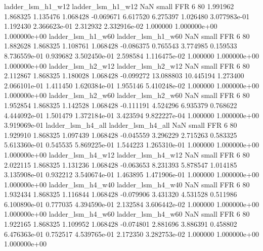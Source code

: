        ladder_lsm_h1_w12        ladder_lsm_h1_w12                   NaN      small      FFR                 6 80 1.991962       1.868325 1.135476       1.068428   -0.069671      6.617520      6.275397     1.026480   3.077983e-01  1.192430 2.366623e-01     2.312932   2.332916e-02            1.000000    1.000000e+00        1.000000e+00
       ladder_lsm_h1_w60        ladder_lsm_h1_w60                   NaN      small      FFR                 6 80 1.882628       1.868325 1.108761       1.068428   -0.086375      0.765543      3.774985     0.159533   8.736559e-01  0.939682 3.502450e-01     2.598584   1.116475e-02            1.000000    1.000000e+00        1.000000e+00
       ladder_lsm_h2_w12        ladder_lsm_h2_w12                   NaN      small      FFR                 6 80 2.112867       1.868325 1.180028       1.068428   -0.099272     13.088803     10.445194     1.273400   2.066101e-01  1.411450 1.620384e-01     1.955146   5.410248e-02            1.000000    1.000000e+00        1.000000e+00
       ladder_lsm_h2_w60        ladder_lsm_h2_w60                   NaN      small      FFR                 6 80 1.952854       1.868325 1.142528       1.068428   -0.111191      4.524296      6.935379     0.768622   4.444092e-01  1.501479 1.372184e-01     3.423594   9.822227e-04            1.000000    1.000000e+00        3.919069e-01
       ladder_lsm_h4_all        ladder_lsm_h4_all                   NaN      small      FFR                 6 80 1.929910       1.868325 1.097439       1.068428   -0.045559      3.296229      2.715263     0.583325   5.613360e-01  0.545535 5.869225e-01     1.544223   1.265310e-01            1.000000    1.000000e+00        1.000000e+00
       ladder_lsm_h4_w12        ladder_lsm_h4_w12                   NaN      small      FFR                 6 80 2.022115       1.868325 1.131236       1.068428   -0.063653      8.231393      5.878547     1.014185   3.135908e-01  0.932212 3.540674e-01     1.463895   1.471906e-01            1.000000    1.000000e+00        1.000000e+00
       ladder_lsm_h4_w40        ladder_lsm_h4_w40                   NaN      small      FFR                 6 80 1.932434       1.868325 1.116844       1.068428   -0.079906      3.431320      4.531528     0.511986   6.100890e-01  0.777035 4.394590e-01     2.132584   3.606442e-02            1.000000    1.000000e+00        1.000000e+00
       ladder_lsm_h4_w60        ladder_lsm_h4_w60                   NaN      small      FFR                 6 80 1.922165       1.868325 1.109952       1.068428   -0.074801      2.881696      3.886391     0.458802   6.476363e-01  0.752517 4.539765e-01     2.172350   3.282753e-02            1.000000    1.000000e+00        1.000000e+00
